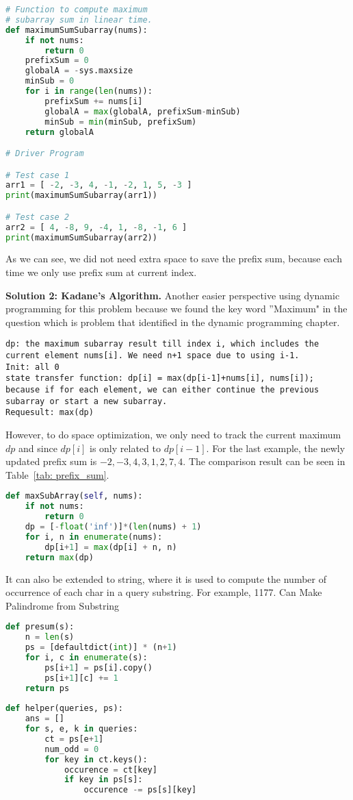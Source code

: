\documentclass[../main.tex]{subfiles}
\begin{document}
\begin{examples}[resume]
\begin{lstlisting}[language = Python]
# Function to compute maximum 
# subarray sum in linear time. 
def maximumSumSubarray(nums): 
    if not nums:
        return 0
    prefixSum = 0
    globalA = -sys.maxsize
    minSub = 0
    for i in range(len(nums)):
        prefixSum += nums[i]
        globalA = max(globalA, prefixSum-minSub)
        minSub = min(minSub, prefixSum)
    return globalA

# Driver Program 

# Test case 1 
arr1 = [ -2, -3, 4, -1, -2, 1, 5, -3 ] 
print(maximumSumSubarray(arr1)) 

# Test case 2 
arr2 = [ 4, -8, 9, -4, 1, -8, -1, 6 ] 
print(maximumSumSubarray(arr2)) 
\end{lstlisting}
As we can see, we did not need extra space to save the prefix sum, because each time we only use prefix sum at current index. 

\textbf{Solution 2: Kadane's Algorithm.} Another easier perspective using dynamic programming for this problem because we found the key word ''Maximum" in the question which is problem that identified in the dynamic programming chapter. 
\begin{lstlisting}[numbers=none]
dp: the maximum subarray result till index i, which includes the current element nums[i]. We need n+1 space due to using i-1.
Init: all 0
state transfer function: dp[i] = max(dp[i-1]+nums[i], nums[i]); because if for each element, we can either continue the previous subarray or start a new subarray. 
Requesult: max(dp)
\end{lstlisting}
However, to do space optimization, we only need to track the current maximum $dp$ and since $dp[i]$ is only related to $dp[i-1]$. For the last example, the newly updated prefix sum is $-2, -3, 4, 3, 1, 2, 7, 4$. The comparison result can be seen in Table~\ref{tab: prefix_sum}. 
\begin{lstlisting}[language=Python]
def maxSubArray(self, nums):
    if not nums:
        return 0
    dp = [-float('inf')]*(len(nums) + 1)
    for i, n in enumerate(nums):
        dp[i+1] = max(dp[i] + n, n)
    return max(dp)
\end{lstlisting}
\end{examples}

It can also be extended to string, where  it is used to compute the number of occurrence of each char in a query substring. For example, 1177. Can Make Palindrome from Substring
\begin{lstlisting}[language=Python]
def presum(s):
    n = len(s)
    ps = [defaultdict(int)] * (n+1)
    for i, c in enumerate(s):
        ps[i+1] = ps[i].copy()
        ps[i+1][c] += 1
    return ps
    
def helper(queries, ps):
    ans = []
    for s, e, k in queries:
        ct = ps[e+1]
        num_odd = 0
        for key in ct.keys():
            occurence = ct[key]
            if key in ps[s]:
                occurence -= ps[s][key]

\end{lstlisting}
\end{document}

